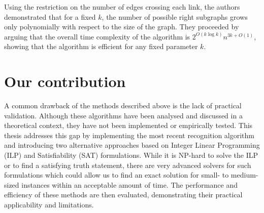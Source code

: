 Using the restriction on the number of edges crossing each link, the authors demonstrated that for a fixed \(k\), the number of possible right subgraphs grows only polynomially with respect to the size of the graph. They proceeded by arguing that the overall time complexity of the algorithm is \(2^{O(k \log k)}n^{3k + O(1)}\), showing that the algorithm is efficient for any fixed parameter \(k\).

\section{Our contribution}\label{sec:our-contribution}

A common drawback of the methods described above is the lack of practical validation. Although these algorithms have been analysed and discussed in a theoretical context, they have not been implemented or empirically tested. This thesis addresses this gap by implementing the most recent recognition algorithm and introducing two alternative approaches based on Integer Linear Programming (ILP) and Satisfiability (SAT) formulations. While it is NP-hard to solve the ILP or to find a satisfying truth statement, there are very advanced solvers for such formulations which could allow us to find an exact solution for small- to medium-sized instances within an acceptable amount of time. The performance and efficiency of these methods are then evaluated, demonstrating their practical applicability and limitations.
